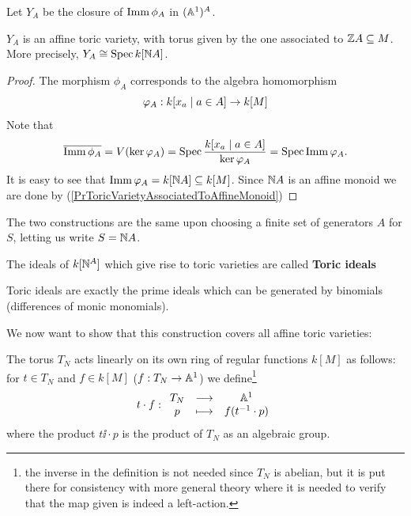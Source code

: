 Let $Y_A$ be the closure of $\operatorname{Imm} \phi_A$ in $(\mathbb{A}^1)^A$.

\begin{proposition}[]
$Y_A$ is an affine toric variety, with torus given by the one associated to $\mathbb{Z} A\subseteq M$. More precisely, $Y_A\cong \operatorname{Spec} k[\mathbb{N} A]$.
\end{proposition}
\begin{proof}
The morphism $\phi_A$ corresponds to the algebra homomorphism
\[\varphi_A:k[x_a\mid a\in A]\to k[M]\]
Note that 
\[\overline{\operatorname{Imm} \phi_A}=V(\ker \varphi_A)=\operatorname{Spec} \frac{k[x_a\mid a\in A]}{\ker\varphi_A}=\operatorname{Spec} \operatorname{Imm} \varphi_A.\]
It is easy to see that $\operatorname{Imm} \varphi_A=k[\mathbb{N} A]\subseteq k[M]$. Since $\mathbb{N} A$ is an affine monoid we are done by (\ref{PrToricVarietyAssociatedToAffineMonoid})
\end{proof}

\begin{remark}
The two constructions are the same upon choosing a finite set of generators $A$ for $S$, letting us write $S=\mathbb{N} A$.
\end{remark}

\begin{definition}
The ideals of $k[\mathbb{N}^A]$ which give rise to toric varieties are called \textbf{Toric ideals}
\end{definition}

\begin{fact}
Toric ideals are exactly the prime ideals which can be generated by binomials (differences of monic monomials).
\end{fact}

We now want to show that this construction covers all affine toric varieties:

\begin{remark}
The torus $T_N$ acts linearly on its own ring of regular functions $k[M]$ as follows: for $t\in T_N$ and $f\in k[M]$ ($f:T_N\to \mathbb{A}^1$) we define\footnote{the inverse in the definition is not needed since $T_N$ is abelian, but it is put there for consistency with more general theory where it is needed to verify that the map given is indeed a left-action.}
\[t\cdot f:\begin{array}{ccc} {T_N} & \longrightarrow & {\mathbb{A}^1}\\ {p} & \longmapsto & {f({t^{-1}\cdot p})} \end{array}\]
where the product $t\ii\cdot p$ is the product of $T_N$ as an algebraic group.
\end{remark}

